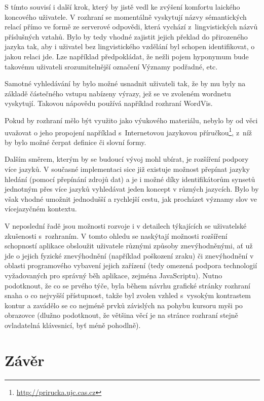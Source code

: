\documentclass[a4paper, 11pt, oneside, showtrims]{book}
\newcommand\ex{\textsf}
\begin{document}
			S tímto souvisí i další krok, který by jistě vedl ke zvýšení komfortu laického koncového uživatele. V rozhraní se momentálně vyskytují názvy sémantických relací přímo ve formě ze serverové odpovědi, která vychází z~lingvistických názvů příslušných vztahů. Bylo by tedy vhodné zajistit jejich překlad do přirozeného jazyka tak, aby i uživatel bez lingvistického vzdělání byl schopen identifikovat, o jakou relaci jde. Lze například předpokládat, že nežli pojem \ex{hyponymum} bude takovému uživateli srozumitelnější označení \ex{Významy podřadné}, etc.

			Samotné vyhledávání by bylo možné usnadnit uživateli tak, že by mu byly na základě částečného vstupu nabízeny výrazy, jež se ve zvoleném wordnetu vyskytují. Takovou nápovědu používá například rozhraní WordVis. \parencite{wordvis2010vercruysse}

			Pokud by rozhraní mělo být využito jako výukového materiálu, nebylo by od věci uvažovat o jeho propojení například s~Internetovou jazykovou příručkou\footnote{\url{http://prirucka.ujc.cas.cz}}, z~níž by bylo možné čerpat definice či slovní formy.

			Dalším směrem, kterým by se budoucí vývoj mohl ubírat, je rozšíření podpory více jazyků. V současné implementaci sice již existuje možnost přepínat jazyky hledání (pomocí přepínání zdrojů dat) a je i možné díky identifikátorům synsetů jednotným přes více jazyků vyhledávat jeden koncept v různých jazycích. Bylo by však vhodné umožnit jednodušší a rychlejší cestu, jak procházet významy slov ve vícejazyčném kontextu.

			V neposlední řadě jsou možnosti rozvoje i v detailech týkajících se uživatelské zkušenosti s~rozhraním. V tomto ohledu se naskýtají možnosti rozšíření schopností aplikace obsloužit uživatele různými způsoby znevýhodněnými, ať už jde o jejich fyzické znevýhodnění (například poškození zraku) či znevýhodnění v oblasti programového vybavení jejich zařízení (tedy omezená podpora technologií vyžadovaných pro správný běh aplikace, zejména JavaScriptu). Nutno podotknout, že co se prvého týče, byla během návrhu grafické stránky rozhraní snaha o co nejvyšší přístupnost, takže byl zvolen vzhled s~vysokým kontrastem kontur a zavádělo se co nejméně prvků závislých na pohybu kursoru myši po obrazovce (dlužno podotknout, že většina věcí je na stránce rozhraní stejně ovladatelná klávesnicí, byť méně pohodlně). 

		\chapter*{Závěr}\label{zaver}
\end{document}
